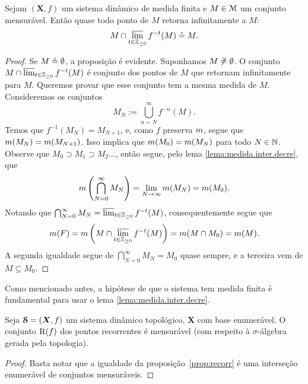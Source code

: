 \begin{theorem}[Recorrência]
\label{teo:recorrencia.poincare}
Sejam $(\bm X,f)$ um sistema dinâmico de medida finita e $M \in \mathcal{M}$ um conjunto mensurável. Então quase todo ponto de $M$ retorna infinitamente a $M$:
	\begin{equation*}
	M \cap \varlimsup_{t \in \mathbb{Z}_{\geq 0}} f^{-t}(M) \circeq M.
	\end{equation*}
\end{theorem}
\begin{proof}
Se $M \circeq \emptyset$, a proposição é evidente. Suponhamos $M \not\circeq \emptyset$. O conjunto $M \cap \varlimsup_{t \in \mathbb{Z}_{\geq 0}} f^{-t}(M)$ é conjunto dos pontos de $M$ que retornam infinitamente para $M$. Queremos provar que esse conjunto tem a mesma medida de $M$. Consideremos os conjuntos
	\begin{equation*}
	M_N := \bigcup_{n=N}^\infty f^{-n}(M).
	\end{equation*}
Temos que $f^{-1}(M_N)=M_{N+1}$, e, como $f$ preserva $m$, segue que $m(M_N)=m(M_{N+1})$. Isso implica que $m(M_0)=m(M_N)$ para todo $N \in \mathbb{N}$. Observe que $M_0 \supset M_1 \supset M_2 \ldots$, então segue, pelo lema \ref{lema:medida.inter.decre}, que
	\begin{equation*}
	m\left( \bigcap_{N=0}^\infty M_N \right) = \lim_{N \to \infty} m(M_N) = m(M_0).
	\end{equation*}
Notando que $\bigcap_{N=0}^\infty M_N = \varlimsup_{t \in \mathbb{Z}_{\geq 0}} f^{-t}(M)$, consequentemente segue que
	\begin{equation*}
	m(F)= m\left(M \cap \varlimsup_{t \in \mathbb{Z}_{\geq 0}} f^{-t}(M) \right) =m(M\cap M_0)=m(M).
	\end{equation*}
A segunda igualdade segue de $\bigcap_{N=0}^\infty M_N = M_0$ quase sempre, e a terceira vem de $M \subseteq M_0$.
\end{proof}

Como mencionado antes, a hipótese de que o sistema tem medida finita é fundamental para usar o lema \ref{lema:medida.inter.decre}.

\begin{proposition}
Seja $\bm{\mathcal{S}}=(\bm X,f)$ um sistema dinâmico topológico, $\bm X$ com base enumerável. O conjunto $\mathrm{R}(f)$ dos pontos recorrentes é mensurável (com respeito à $\sigma$-álgebra gerada pela topologia).
\end{proposition}
\begin{proof}
Basta notar que a igualdade da proposição~\ref{prop:recorr} é uma interseção enumerável de conjuntos mensuráveis.
\end{proof}


